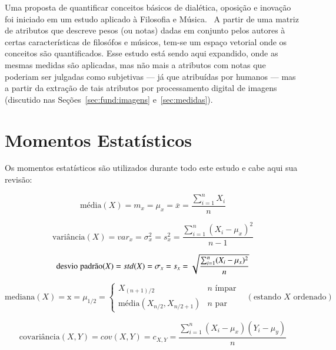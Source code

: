 Uma proposta de quantificar conceitos básicos de dialética, oposição e
inovação foi iniciado em um estudo aplicado à Filosofia e
Música.~\cite{vieira} A partir de uma matriz de atributos que descreve
pesos (ou notas) dadas em conjunto pelos autores à certas
características de filosófos e músicos, tem-se um espaço vetorial onde
os conceitos são quantificados. Esse estudo está sendo aqui expandido,
onde as mesmas medidas são aplicadas, mas não mais a atributos com
notas que poderiam ser julgadas como subjetivas --- já que atribuídas
por humanos --- mas a partir da extração de tais atributos por
processamento digital de imagens (discutido nas
Seções~\ref{sec:fund:imagens} e~\ref{sec:medidas}).

\section{Momentos Estatísticos}

Os momentos estatísticos são utilizados durante todo este estudo e cabe aqui sua revisão:

\begin{equation}
\text{média}(X) = m_x=\mu_x=\overline{x}=\frac{\sum_{i=1}^{n}X_i}{n}
\end{equation}

\begin{equation}
\text{variância}(X)=var_x=\sigma^2_x=s^2_x=\frac{\sum_{i=1}^{n}(X_i-\mu_x)^2}{n-1}
\end{equation}

\begin{equation}
\text{desvio\;padrão}(X)=std(X)=\sigma_x=s_x=\sqrt{\frac{\sum_{i=1}^{n}(X_i-\mu_x)^2}{n}}
\end{equation}

\begin{equation}
\text{mediana}(X) = \text{\~{x}} =\mu_{1/2}= \begin{cases}
                               X_{(n+1)/2} & n \,\, \text{ímpar} \\
                               \text{média}(X_{n/2}, X_{n/2+1}) & n \,\, \text{par}
                               \end{cases} \,\,\,\,\, (\text{estando $X$ ordenado})
\end{equation}


\begin{equation}
\text{covariância}(X,Y)=cov(X,Y)=c_{X,Y}=\frac{\sum_{i=1}^{n}(X_i-\mu_x)(Y_i-\mu_y) }{n}
\end{equation}


